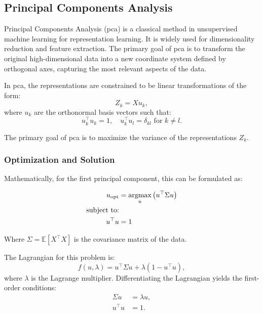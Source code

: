 \subsection{Principal Components Analysis}

Principal Components Analysis \citep{hotelling1933analysis} (\acrshort{pca}) is a classical method in unsupervised machine learning for representation learning.
It is widely used for dimensionality reduction and feature extraction.
The primary goal of \acrshort{pca} is to transform the original high-dimensional data into a new coordinate system defined by orthogonal axes, capturing the most relevant aspects of the data.

In \acrshort{pca}, the representations are constrained to be linear transformations of the form:
\begin{equation}
    \label{eq:pca-linear-function-def}
    Z_k = X u_k,
\end{equation}
where $u_k$ are the orthonormal basis vectors such that:
\begin{equation}
    \label{eq:pca-orthonormality-constraint}
    u_k^\top u_k = 1, \quad
    u_k^\top u_l = \delta_{kl} \text{ for } k \neq l.
\end{equation}

The primary goal of \acrshort{pca} is to maximize the variance of the representations \(Z_k\).

\subsubsection{Optimization and Solution}
Mathematically, for the first principal component, this can be formulated as:

\begin{align}
    u_{\text{opt}} & = \underset{u}{\text{argmax}} \left( u^\top \Sigma u \right) \\
    \text{subject to:} \notag                                                     \\
    u^\top u       & = 1 \notag
\end{align}

Where \(\Sigma = \mathbb{E}[X^\top X]\) is the covariance matrix of the data.

The Lagrangian for this problem is:
\begin{equation}
    f(u,\lambda) = u^\top \Sigma u + \lambda(1 - u^\top u),
\end{equation}
where \(\lambda\) is the Lagrange multiplier. Differentiating the Lagrangian yields the first-order conditions:
\begin{align}
    \Sigma u & = \lambda u, \\
    u^\top u & = 1.
\end{align}

